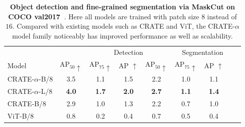 \documentclass[../../book-main.tex]{subfiles}
\begin{document}
\begin{table}[b]
\caption{\small \textbf{Object detection and fine-grained
segmentation via MaskCut on COCO val2017~\citep{lin2014microsoft}}.
Here all models are trained with patch size \(8\) instead of \(16\).
Compared with existing models such as CRATE and ViT, the
CRATE-\(\alpha\) model family noticeably has improved performance as
well as scalability.}
\centering
\begin{tabular}{@{}lcccccccc@{}}
\toprule
&  & \multicolumn{3}{c}{Detection} &  \multicolumn{3}{c}{Segmentation} \\
Model & AP$_{50} \uparrow $ & AP$_{75} \uparrow $ & AP $\uparrow$ &
AP$_{50} \uparrow$ & AP$_{75} \uparrow $ & AP $\uparrow$ \\
\midrule
\midrule
CRATE-\(\alpha\)-B/8 & 3.5 & 1.1 & 1.5 & 2.2 & 1.0 & 1.1 \\
CRATE-\(\alpha\)-L/8 & \textbf{4.0} & \textbf{1.7} & \textbf{2.0} &
\textbf{2.7} & \textbf{1.1} & \textbf{1.4} \\
\midrule
\color{gray}CRATE-B/8 & \color{gray}2.9 & \color{gray}1.0 &
\color{gray}1.3 & \color{gray}2.2 & \color{gray}0.7 & \color{gray}1.0 \\
\color{gray}ViT-B/8 & \color{gray}0.8 & \color{gray}0.2 &
\color{gray}0.4 & \color{gray}0.7 & \color{gray}0.5 & \color{gray}0.4 \\
\bottomrule
\end{tabular}
\label{tab:crate_alpha_detection_segmentation}
\end{table}
\end{document}
